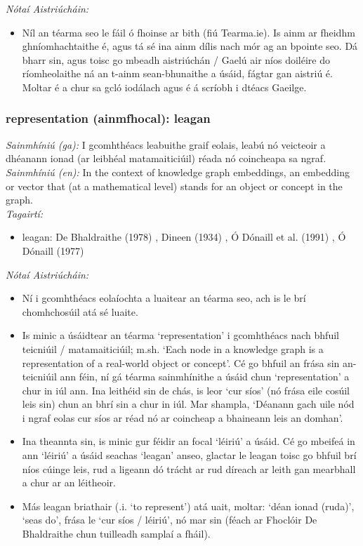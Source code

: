  \noindent \textit{Nótaí Aistriúcháin:}
\begin{itemize}
	\item Níl an téarma seo le fáil ó fhoinse ar bith (fiú Tearma.ie). Is ainm ar fheidhm ghníomhachtaithe é, agus tá sé ina ainm dílis nach mór ag an bpointe seo. Dá bharr sin, agus toisc go mbeadh aistriúchán / Gaelú air níos doiléire do ríomheolaithe ná an t-ainm sean-bhunaithe a úsáid, fágtar gan aistriú é. Moltar é a chur sa gcló iodálach agus é á scríobh i dtéacs Gaeilge.
\end{itemize}


\subsubsection*{representation (ainmfhocal): leagan}
 \noindent \textit{Sainmhíniú (ga):} I gcomhthéacs leabuithe graif eolais, leabú nó veicteoir a dhéanann ionad (ar leibhéal matamaiticiúil) réada nó coincheapa sa ngraf.
\\
 \noindent \textit{Sainmhíniú (en):} In the context of knowledge graph embeddings, an embedding or vector that (at a mathematical level) stands for an object or concept in the graph.
\\
 \noindent \textit{Tagairtí:}
\begin{itemize}
	\item leagan: De Bhaldraithe (1978) \cite{de-bhaldraithe}, Dineen (1934) \cite{dineen}, Ó Dónaill et al. (1991) \cite{focloir-beag}, Ó Dónaill (1977) \cite{odonaill}
\end{itemize}

 \noindent \textit{Nótaí Aistriúcháin:}
\begin{itemize}
	\item Ní i gcomhthéacs eolaíochta a luaitear an téarma seo, ach is le brí chomhchosúil atá sé luaite.
	\item Is minic a úsáidtear an téarma `representation' i gcomhthéacs nach bhfuil teicniúil / matamaiticiúil; m.sh. `Each node in a knowledge graph is a representation of a real-world object or concept'. Cé go bhfuil an frása sin an-teicniúil ann féin, ní gá téarma sainmhínithe a úsáid chun `representation' a chur in iúl ann. Ina leithéid sin de chás, is leor `cur síos' (nó frása eile cosúil leis sin) chun an bhrí sin a chur in iúl. Mar shampla, `Déanann gach uile nód i ngraf eolas cur síos ar réad nó ar coincheap a bhaineann leis an domhan'.
	\item Ina theannta sin, is minic gur féidir an focal `léiriú' a úsáid. Cé go mbeifeá in ann `léiriú' a úsáid seachas `leagan' anseo, glactar le leagan toisc go bhfuil brí níos cúinge leis, rud a ligeann dó trácht ar rud díreach ar leith gan mearbhall a chur ar an léitheoir.
	\item Más leagan briathair (.i. `to represent') atá uait, moltar: `déan ionad (ruda)', `seas do', frása le `cur síos / léiriú', nó mar sin (féach ar Fhoclóir De Bhaldraithe chun tuilleadh samplaí a fháil).
\end{itemize}



